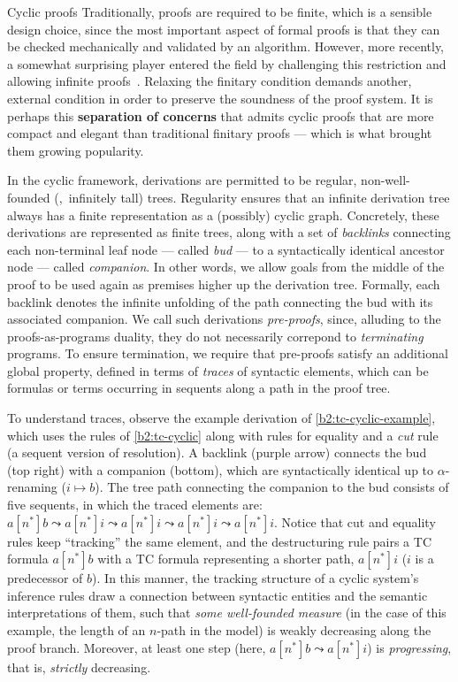 \begin{paragraph}{Cyclic proofs}
Traditionally, proofs are required to be finite, which is a sensible design choice, since the most important aspect of formal proofs is that they can be checked mechanically and validated by an algorithm.
However, more recently, a somewhat surprising player entered the field by challenging this restriction and allowing infinite proofs~\cite{LICS2007:Brotherston}.
Relaxing the finitary condition demands another, external condition in order to preserve the soundness of the proof system.
It is perhaps this \textbf{separation of concerns} that admits cyclic proofs that are more compact and elegant than traditional finitary proofs --- which is what brought them growing popularity.

In the cyclic framework, derivations are permitted to be regular,
non-well-founded (\ie,~infinitely tall) trees.
Regularity ensures that an infinite derivation tree always has a finite representation
as a (possibly) cyclic graph.
Concretely, these derivations are represented as finite trees, 
along with a set of \emph{backlinks} connecting each
non-terminal leaf node --- called \emph{bud} ---
to a syntactically identical ancestor node --- called \emph{companion}.
In other words, we allow goals from the middle of the proof to be
used again as premises higher up the derivation tree.
Formally, each backlink denotes the infinite unfolding of the
path connecting the bud with its associated companion.
We call such derivations \emph{pre-proofs}, since, alluding to the proofs-as-programs duality, they do not necessarily correpond to \emph{terminating} programs.
To ensure termination, we require that pre-proofs satisfy
an additional global property, defined in terms of \emph{traces} of syntactic elements, which can be formulas or terms occurring in sequents along a path in the proof tree.

To understand traces, observe the example derivation of \autoref{b2:tc-cyclic-example}, which uses the rules of \autoref{b2:tc-cyclic} along with rules for equality and a \emph{cut} rule (a sequent version of resolution).
A backlink (purple arrow) connects the bud (top right) with a companion (bottom), which are syntactically identical up to $\alpha$-renaming ($i\mapsto b$).
The tree path connecting the companion to the bud consists of five sequents, in which the traced elements are:
$a[n^*]b\leadsto a[n^*]i\leadsto a[n^*]i\leadsto a[n^*]i\leadsto a[n^*]i$.
Notice that cut and equality rules keep ``tracking'' the same element, and the destructuring rule {} pairs a TC formula $a[n^*]b$ with a TC formula representing a shorter path, $a[n^*]i$ ($i$ is a predecessor of $b$).
In this manner, the tracking structure of a cyclic system's inference rules draw a connection between syntactic entities and the semantic interpretations of them, such that \emph{some well-founded measure} (in the case of this example, the length of an $n$-path in the model) is weakly decreasing along the proof branch.
Moreover, at least one step (here, $a[n^*]b\leadsto a[n^*]i$) is \emph{progressing}, that is, \emph{strictly} decreasing.
\end{paragraph}



